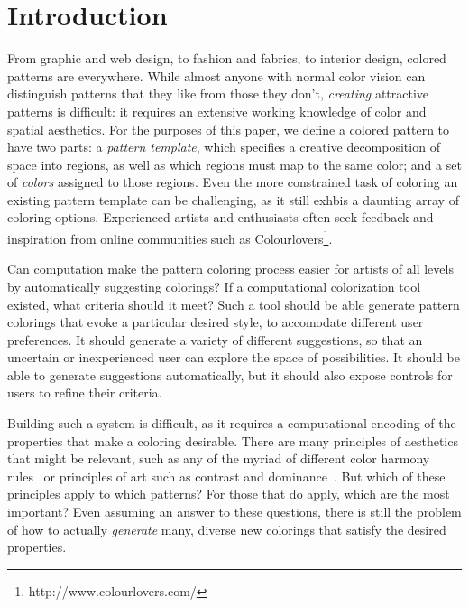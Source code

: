 \section{Introduction}
\label{sec:introduction}

From graphic and web design, to fashion and fabrics, to interior design, colored patterns are everywhere. While almost anyone with normal color vision can distinguish patterns that they like from those they don't, \emph{creating} attractive patterns is difficult: it requires an extensive working knowledge of color and spatial aesthetics. For the purposes of this paper, we define a colored pattern to have two parts: a \emph{pattern template}, which specifies a creative decomposition of space into regions, as well as which regions must map to the same color; and a set of \emph{colors} assigned to those regions. Even the more constrained task of coloring an existing pattern template can be challenging, as it still exhbis a daunting array of coloring options. Experienced artists and enthusiasts often seek feedback and inspiration from online communities such as Colourlovers\footnote{http://www.colourlovers.com/}.

Can computation make the pattern coloring process easier for artists of all levels by automatically suggesting colorings? If a computational colorization tool existed, what criteria should it meet? Such a tool should be able generate pattern colorings that evoke a particular desired style, to accomodate different user preferences. It should generate a variety of different suggestions, so that an uncertain or inexperienced user can explore the space of possibilities. It should be able to generate suggestions automatically, but it should also expose controls for users to refine their criteria.

Building such a system is difficult, as it requires a computational encoding of the properties that make a coloring desirable. There are many principles of aesthetics that might be relevant, such as any of the myriad of different color harmony rules~\cite{ColorHarmonyBook} or principles of art such as contrast and dominance~\cite{ArtPrinciples}. But which of these principles apply to which patterns? For those that do apply, which are the most important? Even assuming an answer to these questions, there is still the problem of how to actually \emph{generate} many, diverse new colorings that satisfy the desired properties.

